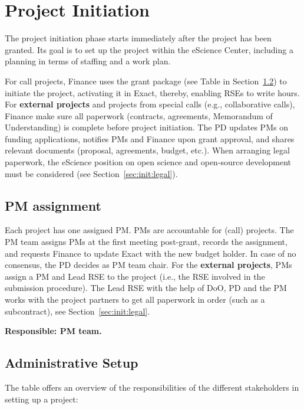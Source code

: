 \section{Project Initiation}
\label{sec:init}
The project initiation phase starts immediately after the project has been granted. Its goal is to set up the project
within the eScience Center, including a planning in terms of staffing and a work plan.

For call projects, Finance uses the grant package (see Table in Section~\ref{sec:init:admin}) to initiate the project, activating it in Exact, thereby, 
enabling RSEs to write hours. For \textbf{external projects} and projects from special calls (e.g., collaborative calls), Finance make sure all 
paperwork (contracts, agreements, Memorandum of Understanding) is complete before project initiation. The PD updates PMs on funding applications, notifies PMs 
and Finance upon grant approval, and shares relevant documents (proposal, agreements, budget, etc.). 
When arranging legal paperwork, the eScience position on open science and open-source development must be considered (see Section~\ref{sec:init:legal}).


\subsection{PM assignment}
\label{sec:init:pm-assign}

Each project has one assigned PM. PMs are accountable for (call) projects. The PM team assigns PMs at the first meeting post-grant, records the assignment, 
and requests Finance to update Exact with the new budget holder. In case of no consensus, the PD decides as PM team chair.
% 
For the \textbf{external projects}, PMs assign a PM and Lead RSE to the project
(i.e., the RSE involved in the submission procedure). The Lead RSE with the help of DoO, PD and the PM works with the project partners
to get all paperwork in order (such as a subcontract), see Section~\ref{sec:init:legal}. 

\textbf{Responsible: PM team.}

\subsection{Administrative Setup}
\label{sec:init:admin}
The table offers an overview of the responsibilities of the different stakeholders in setting up a project:

